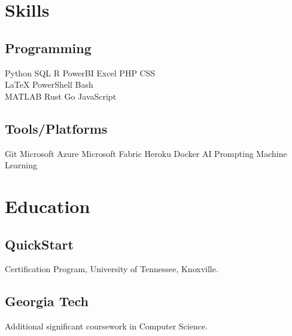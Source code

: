 \documentclass[]{plushcv}
\begin{document}
\begin{paracol}{2}
\switchcolumn[1]



\section{Skills}
\subsection{Programming}
\sectionsep
{}
Python \textbullet{} SQL \textbullet{} R \textbullet{} PowerBI \textbullet{} Excel \textbullet{} PHP \textbullet{} CSS \\
\sectionsep
{}
\LaTeX \textbullet{}  PowerShell \textbullet{}  Bash \\
\sectionsep
{}
MATLAB \textbullet{} Rust \textbullet{} Go \textbullet{} JavaScript \\
\sectionsep
\sectionsep
\subsection{Tools/Platforms}
\sectionsep
Git \textbullet{} Microsoft Azure \textbullet{} Microsoft Fabric \textbullet{} Heroku \textbullet{} Docker \textbullet{} AI Prompting \textbullet{} Machine Learning \\

\sectionsep


\section{Education} 
\subsection{QuickStart}
Certification Program, University of Tennessee, Knoxville. \\

\sectionsep
\subsection{Georgia Tech}
Additional significant coursework in Computer Science. \\
\sectionsep


\end{paracol}
\end{document}
